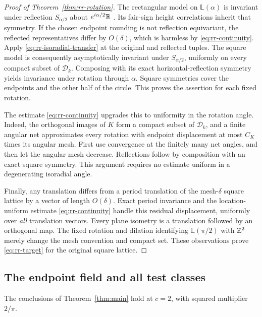 \begin{proof}[Proof of Theorem~\ref{thm:rr-rotation}]
The rectangular model on $\mathbb L(\alpha)$ is invariant under
reflection $S_{\alpha/2}$ about $e^{i\alpha/2}\mathbb R$
\cite[Remark~1.8]{DCKKMO2026Rotation}.  Its fair-sign height
correlations inherit that symmetry.  If the chosen endpoint
rounding is not reflection equivariant, the reflected
representatives differ by $O(\delta)$, which is harmless by
\eqref{eq:rr-continuity}.  Apply
\eqref{eq:rr-isoradial-transfer} at the original and reflected
tuples.  The square model is consequently asymptotically invariant
under $S_{\alpha/2}$, uniformly on every compact subset of
$\mathcal D_k$.  Composing with its exact horizontal-reflection
symmetry yields invariance under rotation through $\alpha$.
Square symmetries cover the endpoints and the other half of the
circle.  This proves the assertion for each fixed rotation.

The estimate \eqref{eq:rr-continuity} upgrades this to uniformity
in the rotation angle.  Indeed, the orthogonal images of $K$ form
a compact subset of $\mathcal D_k$, and a finite angular net
approximates every rotation with endpoint displacement at most
$C_K$ times its angular mesh.  First use convergence at the
finitely many net angles, and then let the angular mesh decrease.
Reflections follow by composition with an exact square symmetry.
This argument requires no estimate uniform in a degenerating
isoradial angle.

Finally, any translation differs from a period translation of the
mesh-$\delta$ square lattice by a vector of length $O(\delta)$.
Exact period invariance and the location-uniform estimate
\eqref{eq:rr-continuity} handle this residual displacement,
uniformly over \emph{all} translation vectors.  Every plane
isometry is a translation followed by an orthogonal map.
The fixed rotation and dilation identifying
$\mathbb L(\pi/2)$ with $\mathbb Z^2$ merely change the mesh convention
and compact set.  These observations prove
\eqref{eq:rr-target} for the original square lattice.
\end{proof}


\subsection{The endpoint field and all test classes}

\begin{proposition}
\label{prop:endpoint-completion}
The conclusions of Theorem~\ref{thm:main} hold at $c=2$, with squared
multiplier $2/\pi$.
\end{proposition}

